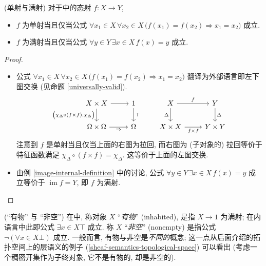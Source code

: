 \begin{example}
	{(单射与满射)}
	对于\topos{}中的态射 $f\colon X\to Y$,
	\begin{itemize}
		\item $f$ 为单射当且仅当公式 $\forall x_1\in X\,\forall x_2\in X\,\big(f(x_1)=f(x_2)\Rightarrow x_1=x_2\big)$ 成立.
		\item $f$ 为满射当且仅当公式 $\forall y\in Y\, \exists x\in X\, f(x)=y$ 成立.
	\end{itemize}
\end{example}
\begin{proof}~
	\begin{itemize}
		\item 公式 $\forall x_1\in X\,\forall x_2\in X\,\big(f(x_1)=f(x_2)\Rightarrow x_1=x_2\big)$ 翻译为外部语言即左下图交换 (见命题 \ref{universally-valid}).
		\[\begin{tikzcd}[ampersand replacement=\&]
			{X\times X} \& 1 \& X \& Y \\
			\Omega\times\Omega \& \Omega \& {X\times X} \& {Y\times Y}
			\arrow["{\big(\chi_\Delta\circ (f\times f),\chi_\Delta\big)}"', from=1-1, to=2-1]
			\arrow["\Rightarrow"', from=2-1, to=2-2]
			\arrow[from=1-1, to=1-2]
			\arrow["\top", from=1-2, to=2-2]
			\arrow["{f\times f}"', from=2-3, to=2-4]
			\arrow["\Delta"', from=1-3, to=2-3]
			\arrow["\Delta", from=1-4, to=2-4]
			\arrow["f", from=1-3, to=1-4]
		\end{tikzcd}\]
		注意到 $f$ 是单射当且仅当上面的右图为拉回, 而右图为 (子对象的) 拉回等价于特征函数满足 $\chi_\Delta\circ (f\times f) = \chi_\Delta$.
		这等价于上面的左图交换.
		\item 由例 \ref{image-internal-definition} 中的讨论, 公式 $\forall y\in Y\, \exists x\in X\, f(x)=y$ 成立等价于 $\operatorname{im}f=Y$, 即 $f$ 为满射.
	\end{itemize}
\end{proof}

\begin{example}
	[label={inhabited-vs-nonempty}]
	{(``有物'' 与 ``非空'')}
	在\topos{}中, 称对象 $X$ ``\emph{有物}'' (inhabited), 是指 $X\to 1$ 为满射; 在内语言中此即公式 $\exists x\in X \top$ 成立. 称 $X$ ``\emph{非空}'' (nonempty) 是指公式 $\neg(\forall x\in X \bot)$ 成立. 一般而言, 有物与非空是\emph{不同的}概念; 这一点从后面介绍的拓扑空间上的层语义的例子 (\ref{sheaf-semantics-topological-space}) 可以看出 (考虑一个稠密开集作为子终对象, 它不是有物的, 却是非空的).
\end{example}

